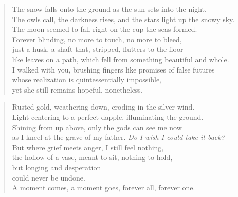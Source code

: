 
\clearpage
\setauthor{}


\begin{verse}
    The snow falls onto the ground as the sun sets into the night.\\
    The owls call, the darkness rises, and the stars light up the snowy sky.\\
    The moon seemed to fall right on the cup the seas formed.\\
    Forever blinding, no more to touch, no more to bleed,\\
    just a husk, a shaft that, stripped, flutters to the floor\\
    like leaves on a path, which fell from something beautiful and whole.\\ 
    I walked with you, brushing fingers like promises of false futures\\
    whose realization is quintessentially impossible,\\
    yet she still remains hopeful, nonetheless.\\    
\end{verse}

\vfill

\begin{verse}
    Rusted gold, weathering down, eroding in the silver wind.\\
    Light centering to a perfect dapple, illuminating the ground.\\
    Shining from up above, only the gods can see me now\\
    as I kneel at the grave of my father. \textit{Do I wish I could take it back?}\\
    But where grief meets anger, I still feel nothing,\\
    the hollow of a vase, meant to sit, nothing to hold,\\
    but longing and desperation\\
    could never be undone.\\
    A moment comes, a moment goes, forever all, forever one.\\    
\end{verse}

